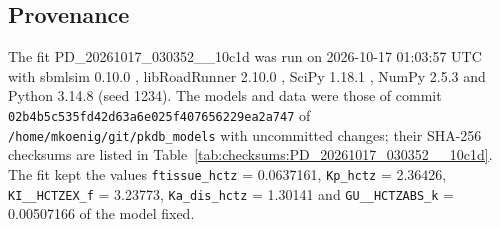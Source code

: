 \documentclass{article}
\begin{document}
\subsection{Provenance}

The fit PD\_20261017\_030352\_\_10c1d was run on 2026-10-17 01:03:57 UTC with sbmlsim 0.10.0 \cite{Koenig2026_sbmlsim}, libRoadRunner 2.10.0 \cite{Welsh2023}, SciPy 1.18.1 \cite{Virtanen2020}, NumPy 2.5.3 \cite{Harris2020} and Python 3.14.8 (seed 1234). The models and data were those of commit \texttt{02b4b5c535fd42d63a6e025f407656229ea2a747} of \texttt{/home/mkoenig/git/pkdb\_models} with uncommitted changes; their SHA-256 checksums are listed in Table~\ref{tab:checksums:PD_20261017_030352__10c1d}. The fit kept the values \texttt{ftissue\_hctz} = 0.0637161, \texttt{Kp\_hctz} = 2.36426, \texttt{KI\_\_HCTZEX\_f} = 3.23773, \texttt{Ka\_dis\_hctz} = 1.30141 and \texttt{GU\_\_HCTZABS\_k} = 0.00507166 of the model fixed.
\end{document}
